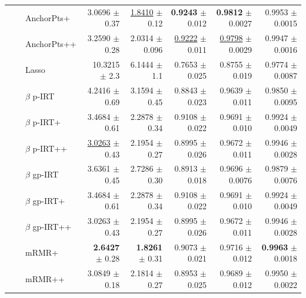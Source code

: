 \begin{longtable}{llp{}rrrrr}
 &  & AnchorPts+ & 3.0696 {\scriptsize $\pm$ 0.37} & \underline{1.8410} {\scriptsize $\pm$ 0.12} & \textbf{0.9243} {\scriptsize $\pm$ 0.012} & \textbf{0.9812} {\scriptsize $\pm$ 0.0027} & 0.9953 {\scriptsize $\pm$ 0.0015} \\
 &  & AnchorPts++ & 3.2590 {\scriptsize $\pm$ 0.28} & 2.0314 {\scriptsize $\pm$ 0.096} & \underline{0.9222} {\scriptsize $\pm$ 0.011} & \underline{0.9798} {\scriptsize $\pm$ 0.0029} & 0.9947 {\scriptsize $\pm$ 0.0016} \\
 &  & Lasso & 10.3215 {\scriptsize $\pm$ 2.3} & 6.1444 {\scriptsize $\pm$ 1.1} & 0.7653 {\scriptsize $\pm$ 0.025} & 0.8755 {\scriptsize $\pm$ 0.019} & 0.9774 {\scriptsize $\pm$ 0.0087} \\
 &  & $\beta$ p-IRT & 4.2416 {\scriptsize $\pm$ 0.69} & 3.1594 {\scriptsize $\pm$ 0.45} & 0.8843 {\scriptsize $\pm$ 0.023} & 0.9639 {\scriptsize $\pm$ 0.011} & 0.9850 {\scriptsize $\pm$ 0.0095} \\
 &  & $\beta$ p-IRT+ & 3.4684 {\scriptsize $\pm$ 0.61} & 2.2878 {\scriptsize $\pm$ 0.34} & 0.9108 {\scriptsize $\pm$ 0.022} & 0.9691 {\scriptsize $\pm$ 0.010} & 0.9924 {\scriptsize $\pm$ 0.0049} \\
 &  & $\beta$ p-IRT++ & \underline{3.0263} {\scriptsize $\pm$ 0.43} & 2.1954 {\scriptsize $\pm$ 0.27} & 0.8995 {\scriptsize $\pm$ 0.026} & 0.9672 {\scriptsize $\pm$ 0.011} & 0.9946 {\scriptsize $\pm$ 0.0028} \\
 &  & $\beta$ gp-IRT & 3.6361 {\scriptsize $\pm$ 0.45} & 2.7286 {\scriptsize $\pm$ 0.30} & 0.8913 {\scriptsize $\pm$ 0.018} & 0.9696 {\scriptsize $\pm$ 0.0076} & 0.9879 {\scriptsize $\pm$ 0.0076} \\
 &  & $\beta$ gp-IRT+ & 3.4684 {\scriptsize $\pm$ 0.61} & 2.2878 {\scriptsize $\pm$ 0.34} & 0.9108 {\scriptsize $\pm$ 0.022} & 0.9691 {\scriptsize $\pm$ 0.010} & 0.9924 {\scriptsize $\pm$ 0.0049} \\
 &  & $\beta$ gp-IRT++ & 3.0263 {\scriptsize $\pm$ 0.43} & 2.1954 {\scriptsize $\pm$ 0.27} & 0.8995 {\scriptsize $\pm$ 0.026} & 0.9672 {\scriptsize $\pm$ 0.011} & 0.9946 {\scriptsize $\pm$ 0.0028} \\
 &  & mRMR+ & \textbf{2.6427} {\scriptsize $\pm$ 0.28} & \textbf{1.8261} {\scriptsize $\pm$ 0.31} & 0.9073 {\scriptsize $\pm$ 0.021} & 0.9716 {\scriptsize $\pm$ 0.012} & \textbf{0.9963} {\scriptsize $\pm$ 0.0018} \\
 &  & mRMR++ & 3.0849 {\scriptsize $\pm$ 0.18} & 2.1814 {\scriptsize $\pm$ 0.27} & 0.8953 {\scriptsize $\pm$ 0.025} & 0.9689 {\scriptsize $\pm$ 0.012} & 0.9950 {\scriptsize $\pm$ 0.0022} \\

\end{longtable}
